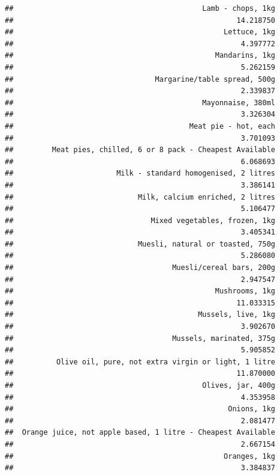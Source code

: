 \documentclass[
  landscape]{article}
\begin{document}
\begin{verbatim}
##                                            Lamb - chops, 1kg 
##                                                    14.218750 
##                                                 Lettuce, 1kg 
##                                                     4.397772 
##                                               Mandarins, 1kg 
##                                                     5.262159 
##                                 Margarine/table spread, 500g 
##                                                     2.339837 
##                                            Mayonnaise, 380ml 
##                                                     3.326304 
##                                         Meat pie - hot, each 
##                                                     3.701093 
##         Meat pies, chilled, 6 or 8 pack - Cheapest Available 
##                                                     6.068693 
##                        Milk - standard homogenised, 2 litres 
##                                                     3.386141 
##                             Milk, calcium enriched, 2 litres 
##                                                     5.106477 
##                                Mixed vegetables, frozen, 1kg 
##                                                     3.405341 
##                             Muesli, natural or toasted, 750g 
##                                                     5.286080 
##                                     Muesli/cereal bars, 200g 
##                                                     2.947547 
##                                               Mushrooms, 1kg 
##                                                    11.033315 
##                                           Mussels, live, 1kg 
##                                                     3.902670 
##                                     Mussels, marinated, 375g 
##                                                     5.905852 
##          Olive oil, pure, not extra virgin or light, 1 litre 
##                                                    11.870000 
##                                            Olives, jar, 400g 
##                                                     4.353958 
##                                                  Onions, 1kg 
##                                                     2.081477 
##  Orange juice, not apple based, 1 litre - Cheapest Available 
##                                                     2.667154 
##                                                 Oranges, 1kg 
##                                                     3.384837 

\end{verbatim}
\end{document}
